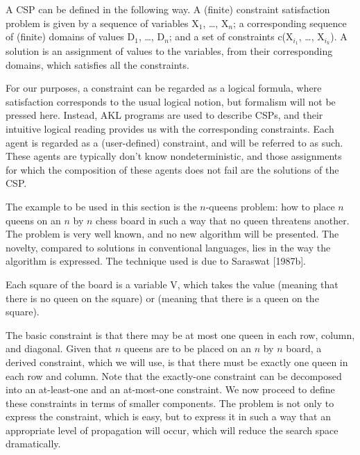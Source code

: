 A CSP can be defined in the following way.  A (finite) constraint
satisfaction problem is given by a sequence of variables {\prog X$_1$},
\dots, {\prog X$_n$}; a corresponding sequence of (finite) domains of
values {\prog D$_1$}, \dots, {\prog D$_n$}; and a set of constraints
{\prog c(X$_{i_1}$, \dots, X$_{i_k}$)}.  A solution is an assignment of
values to the variables, from their corresponding domains, which
satisfies all the constraints.

For our purposes, a constraint can be regarded as a logical formula,
where satisfaction corresponds to the usual logical notion, but
formalism will not be pressed here.  Instead, AKL programs are used to
describe CSPs, and their intuitive logical reading provides us with
the corresponding constraints.  Each agent is regarded as a
(user-defined) constraint, and will be referred to as such.  These
agents are typically don't know nondeterministic, and those
assignments for which the composition of these agents does not fail
are the solutions of the CSP.

The example to be used in this section is the $n$-queens problem: how
to place $n$ queens on an $n$ by $n$ chess board in such a way that no
queen threatens another.  The problem is very well known, and no new
algorithm will be presented.  The novelty, compared to solutions in
conventional languages, lies in the way the algorithm is expressed.
The technique used is due to Saraswat [1987b].

Each square of the board is a variable {\prog V}, which takes the
value {} (meaning that there is no queen on the square) or
{} (meaning that there is a queen on the square).

The basic constraint is that there may be at most one queen in each
row, column, and diagonal.  Given that $n$ queens are to be placed on
an $n$ by $n$ board, a derived constraint, which we will use, is that
there must be exactly one queen in each row and column.  Note that the
exactly-one constraint can be decomposed into an at-least-one and an
at-most-one constraint.  We now proceed to define these constraints in
terms of smaller components.  The problem is not only to express the
constraint, which is easy, but to express it in such a way that an
appropriate level of propagation will occur, which will reduce the
search space dramatically.

